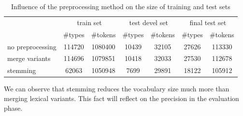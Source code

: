 \begin{table}[h!]
\begin{tabular}{ l | c c | c c | c c|}
& \multicolumn{2}{|c}{train set} & \multicolumn{2}{|c}{test devel set} & \multicolumn{2}{|c|}{final test set} \\
   &  \#types & \#tokens  &  \#types & \#tokens  &  \#types & \#tokens \\
  \hline                       
  no preprocessing & 114720 & 1080400 & 10439 & 32105 & 27626 & 113330\\
  merge variants & 114696 & 1079851 & 10418 &  32033 & 27530 &112678\\
  stemming & 62063 & 1050948 & 7699 & 29891 & 18122 & 105912\\
\end{tabular}
\caption{Influence of the preprocessing method on the size of training and test sets}
\end{table}
We can observe that stemming reduces the vocabulary size much more than merging 
lexical variants. This fact will reflect on the precision in the evaluation phase. 

